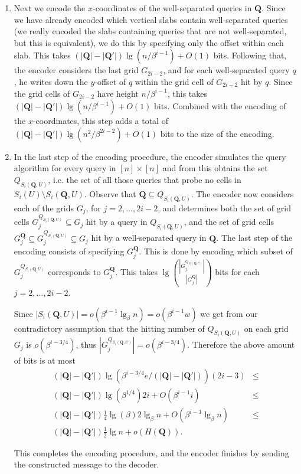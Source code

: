 \documentclass[letterpaper]{article}
\newcommand{\Q}{\textbf{Q}}
\begin{document}
\begin{enumerate}
\item Next we encode the $x$-coordinates of the well-separated queries
  in $\Q$. Since we have already encoded which vertical slabs contain
  well-separated queries (we really encoded the slabs containing
  queries that are not well-separated, but this is equivalent), we do
  this by specifying only the offset within each slab. This takes
  $(|\Q|-|\Q'|)\lg(n/\beta^{i-1})+O(1)$ bits. Following that, the
  encoder considers the last grid $G_{2i-2}$, and for each
  well-separated query $q$, he writes down the $y$-offset of $q$
  within the grid cell of $G_{2i-2}$ hit by $q$. Since the grid cells
  of $G_{2i-2}$ have height $n/\beta^{i-1}$, this takes
  $(|\Q|-|\Q'|)\lg(n/\beta^{i-1})+O(1)$ bits. Combined with the encoding
  of the $x$-coordinates, this step adds a total of
  $(|\Q|-|\Q'|)\lg(n^2/\beta^{2i-2})+O(1)$ bits to the size of the
  encoding.

\item In the last step of the encoding procedure, the encoder
  simulates the query algorithm for every query in $[n] \times [n]$
  and from this obtains the set $Q_{S_i(\Q,U)}$, i.e. the set of all
  those queries that probe no cells in $S_i(U) \setminus
  S_i(\Q,U)$. Observe that $\Q \subseteq Q_{S_i(\Q,U)}$. The encoder now
  considers each of the grids $G_j$, for $j=2,\dots,2i-2$, and
  determines both the set of grid cells $G_j^{Q_{S_i(\Q,U)}} \subseteq
  G_j$ hit by a query in $Q_{S_i(\Q,U)}$, and the set of grid cells
  $G_j^{\Q} \subseteq G_j^{Q_{S_i(\Q,U)}} \subseteq G_j$ hit by a
  well-separated query in $\Q$. The last step of the encoding consists
  of specifying $G_j^{\Q}$. This is done by encoding which subset of
  $G_j^{Q_{S_i(\Q,U)}}$ corresponds to $G_j^{\Q}$. This takes $\lg
  \binom{|G_j^{Q_{S_i(\Q,U)}}|}{|G_j^{\Q}|}$ bits for each
  $j=2,\dots,2i-2$.

Since $|S_i(\Q,U)|=o(\beta^{i-1}\lg_\beta n)=o(\beta^{i-1}w)$ we get
from our contradictory assumption that the hitting number of
$Q_{S_i(\Q,U)}$ on each grid $G_j$ is $o(\beta^{i-3/4})$, thus
$|G_j^{Q_{S_i(\Q,U)}}|=o(\beta^{i-3/4})$. Therefore the above amount of
bits is at most
\begin{eqnarray*}
(|\Q|-|\Q'|)\lg(\beta^{i-3/4} e/(|\Q|-|\Q'|))(2i-3) &\leq \\
(|\Q|-|\Q'|)\lg(\beta^{1/4})2i+O(\beta^{i-1}i) &\leq \\
(|\Q|-|\Q'|)\tfrac{1}{4}\lg(\beta)2\lg_\beta n+O(\beta^{i-1}\lg_\beta
n)&\leq \\
(|\Q|-|\Q'|)\tfrac{1}{2}\lg n+o(H(\Q)).
\end{eqnarray*}

This completes the encoding procedure, and the encoder finishes by
sending the constructed message to the decoder.
\end{enumerate}
\end{document}
